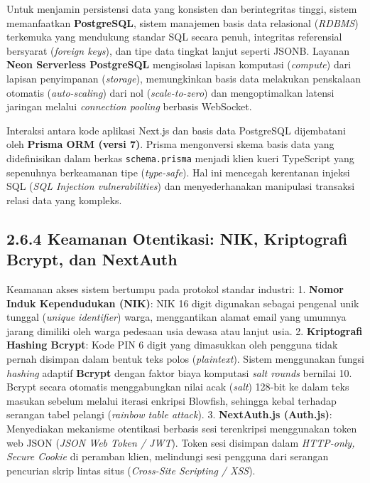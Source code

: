 \documentclass[
  indonesian,
  12pt,
]{report}
\begin{document}
Untuk menjamin persistensi data yang konsisten dan berintegritas tinggi,
sistem memanfaatkan \textbf{PostgreSQL}, sistem manajemen basis data
relasional (\emph{RDBMS}) terkemuka yang mendukung standar SQL secara
penuh, integritas referensial bersyarat (\emph{foreign keys}), dan tipe
data tingkat lanjut seperti JSONB. Layanan \textbf{Neon Serverless
PostgreSQL} mengisolasi lapisan komputasi (\emph{compute}) dari lapisan
penyimpanan (\emph{storage}), memungkinkan basis data melakukan
penskalaan otomatis (\emph{auto-scaling}) dari nol
(\emph{scale-to-zero}) dan mengoptimalkan latensi jaringan melalui
\emph{connection pooling} berbasis WebSocket.

Interaksi antara kode aplikasi Next.js dan basis data PostgreSQL
dijembatani oleh \textbf{Prisma ORM (versi 7)}. Prisma mengonversi skema
basis data yang didefinisikan dalam berkas \texttt{schema.prisma}
menjadi klien kueri TypeScript yang sepenuhnya berkeamanan tipe
(\emph{type-safe}). Hal ini mencegah kerentanan injeksi SQL (\emph{SQL
Injection vulnerabilities}) dan menyederhanakan manipulasi transaksi
relasi data yang kompleks.

\subsection{2.6.4 Keamanan Otentikasi: NIK, Kriptografi Bcrypt, dan
NextAuth}\label{keamanan-otentikasi-nik-kriptografi-bcrypt-dan-nextauth}

Keamanan akses sistem bertumpu pada protokol standar industri: 1.
\textbf{Nomor Induk Kependudukan (NIK)}: NIK 16 digit digunakan sebagai
pengenal unik tunggal (\emph{unique identifier}) warga, menggantikan
alamat email yang umumnya jarang dimiliki oleh warga pedesaan usia
dewasa atau lanjut usia. 2. \textbf{Kriptografi Hashing Bcrypt}: Kode
PIN 6 digit yang dimasukkan oleh pengguna tidak pernah disimpan dalam
bentuk teks polos (\emph{plaintext}). Sistem menggunakan fungsi
\emph{hashing} adaptif \textbf{Bcrypt} dengan faktor biaya komputasi
\emph{salt rounds} bernilai 10. Bcrypt secara otomatis menggabungkan
nilai acak (\emph{salt}) 128-bit ke dalam teks masukan sebelum melalui
iterasi enkripsi Blowfish, sehingga kebal terhadap serangan tabel
pelangi (\emph{rainbow table attack}). 3. \textbf{NextAuth.js
(Auth.js)}: Menyediakan mekanisme otentikasi berbasis sesi terenkripsi
menggunakan token web JSON (\emph{JSON Web Token / JWT}). Token sesi
disimpan dalam \emph{HTTP-only, Secure Cookie} di peramban klien,
melindungi sesi pengguna dari serangan pencurian skrip lintas situs
(\emph{Cross-Site Scripting / XSS}).
\end{document}
